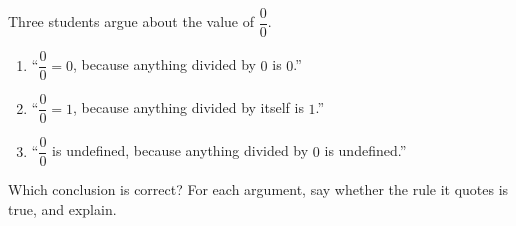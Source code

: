 Three students argue about the value of $\dfrac00$.
\begin{enumerate}
\item ``$\dfrac00=0$, because anything divided by $0$ is $0$.''
\item ``$\dfrac00=1$, because anything divided by itself is $1$.''
\item ``$\dfrac00$ is undefined, because anything divided by $0$ is undefined.''
\end{enumerate}
Which conclusion is correct? For each argument, say whether the rule it quotes is true, and explain.
